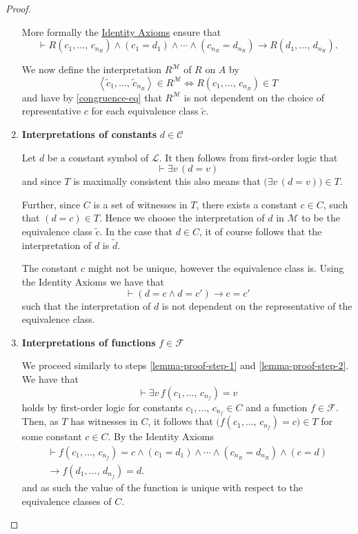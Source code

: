 \documentclass[../../main.tex]{subfiles}
\begin{document}
\begin{proof}
\begin{enumerate}
        More formally the \hyperref[identity-axioms]{Identity Axioms} ensure that
        $$\vdash R(c_1,\ldots,\,c_{n_R}) \wedge (c_1 = d_1) \wedge \cdots \wedge (c_{n_R} = d_{n_R}) \rightarrow R(d_1,\ldots,\,d_{n_R}).$$

        We now define the interpretation $R^\mathcal{M}$ of $R$ on $A$ by
        $$\left<\tilde{c}_1,\ldots,\,\tilde{c}_{n_R}\right> \in R^\mathcal{M} \iff R(c_1,\ldots,\,c_{n_R}) \in T$$
        and have by \eqref{congruence-eq} that $R^\mathcal{M}$ is not dependent on the choice of representative $c$ for each equivalence class $\tilde{c}$.

        \item \label{lemma-proof-step-2} \textbf{Interpretations of constants} $d \in \mathcal{C}$
        
        Let $d$ be a constant symbol of $\mathcal{L}$.
        It then follows from first-order logic that 
        $$\vdash \exists v \, (d = v)$$
        and since $T$ is maximally consistent this also means that $\big(\exists v \, (d = v)\big) \in T$.
        
        Further, since $C$ is a set of witnesses in $T$, there exists a constant $c \in C$, such that $(d = c) \in T$.
        Hence we choose the interpretation of $d$ in $\mathcal{M}$ to be the equivalence class $\tilde{c}$.
        In the case that $d \in C$, it of course follows that the interpretation of $d$ is $\tilde{d}$.

        The constant $c$ might not be unique, however the equivalence class is.
        Using the Identity Axioms we have that
        $$\vdash (d = c \wedge d = c') \rightarrow c = c'$$
        such that the interpretation of $d$ is not dependent on the representative of the equivalence class.

        \item \label{lemma-proof-step-3}\textbf{Interpretations of functions} $f \in \mathcal{F}$
        
        We proceed similarly to steps \ref{lemma-proof-step-1} and \ref{lemma-proof-step-2}.
        We have that
        $$\vdash \exists v\, f(c_1,\ldots,\, c_{n_f}) = v$$
        holds by first-order logic for constants $c_1,\ldots,\, c_{n_f} \in C$ and a function $f \in \mathcal{F}$.
        Then, as $T$ has witnesses in $C$, it follows that $\big(f(c_1,\ldots,\, c_{n_f}) = c\big) \in T$ for some constant $c \in C$.
        By the Identity Axioms
        \begin{multline}\label{function-congruence-eq}
            \vdash f(c_1,\ldots,\,c_{n_f}) = c \wedge (c_1 = d_1) \wedge \cdots \wedge (c_{n_R} = d_{n_R}) \wedge (c = d) \\
            \rightarrow f(d_1,\ldots,\,d_{n_f})= d.
        \end{multline}
        and as such the value of the function is unique with respect to the equivalence classes of $C$.


\end{enumerate}
\end{proof}
\end{document}
